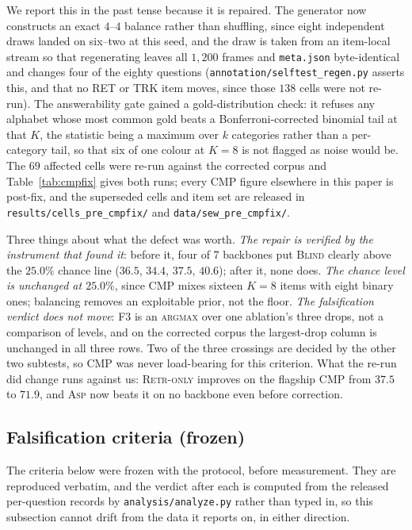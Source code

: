 \documentclass[10pt]{article}
\newcommand{\VnBackbones}{seven}
\providecommand{\VnBackbones}{--}
\renewcommand{\VnBackbones}{7}
\theoremstyle{definition}
\theoremstyle{plain}
\newcommand{\ASP}{\textsc{Asp}}
\begin{document}
We report this in the past tense because it is repaired. The generator now constructs an exact
$4$--$4$ balance rather than shuffling, since eight independent draws landed on six--two at this
seed, and the draw is taken from an item-local stream so that regenerating leaves all $1{,}200$
frames and \texttt{meta.json} byte-identical and changes four of the eighty questions
(\texttt{annotation/selftest\_regen.py} asserts this, and that no RET or TRK item moves, since
those $138$ cells were not re-run). The answerability gate gained a gold-distribution check: it
refuses any alphabet whose most common gold beats a Bonferroni-corrected binomial tail at that
$K$, the statistic being a maximum over $k$ categories rather than a per-category tail, so that
six of one colour at $K{=}8$ is not flagged as noise would be. The $69$ affected cells were
re-run against the corrected corpus and Table~\ref{tab:cmpfix} gives both runs; every CMP figure
elsewhere in this paper is post-fix, and the superseded cells and item set are released in
\texttt{results/cells\_pre\_cmpfix/} and \texttt{data/sew\_pre\_cmpfix/}.

Three things about what the defect was worth. \emph{The repair is verified by the instrument
that found it}: before it, four of \VnBackbones{} backbones put \textsc{Blind} clearly above the
$25.0\%$ chance line ($36.5$, $34.4$, $37.5$, $40.6$); after it, none does. \emph{The chance
level is unchanged at $25.0\%$}, since CMP mixes sixteen $K{=}8$ items with eight binary ones;
balancing removes an exploitable prior, not the floor. \emph{The falsification verdict does not
move}: F3 is an \textsc{argmax} over one ablation's three drops, not a comparison of levels, and
on the corrected corpus the largest-drop column is unchanged in all three rows. Two of the three
crossings are decided by the other two subtests, so CMP was never load-bearing for this
criterion. What the re-run did change runs against us: \textsc{Retr-only} improves on the
flagship CMP from $37.5$ to $71.9$, and \ASP{} now beats it on no backbone even before
correction.

\subsection{Falsification criteria (frozen)}
\label{sec:falsify}
The criteria below were frozen with the protocol, before measurement. They are reproduced verbatim, and the verdict after each is computed from the released per-question records by \texttt{analysis/analyze.py} rather than typed in, so this subsection cannot drift from the data it reports on, in either direction.
\end{document}
